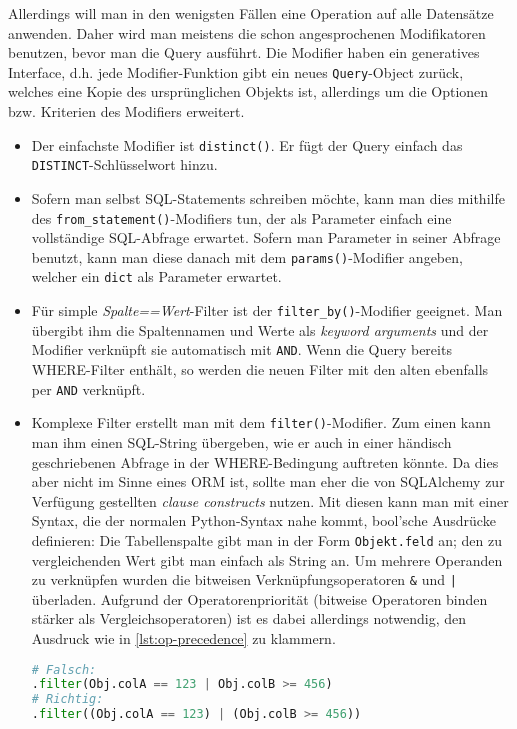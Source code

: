 Allerdings will man in den wenigsten Fällen eine Operation auf alle Datensätze
anwenden. Daher wird man meistens die schon angesprochenen Modifikatoren
benutzen, bevor man die Query ausführt. Die Modifier haben ein generatives
Interface, d.h. jede Modifier-Funktion gibt ein neues \texttt{Query}-Object
zurück, welches eine Kopie des ursprünglichen Objekts ist, allerdings um die
Optionen bzw. Kriterien des Modifiers erweitert.

\begin{itemize}
\item Der einfachste Modifier ist \texttt{distinct()}. Er fügt der Query einfach
das \texttt{DISTINCT}-Schlüsselwort hinzu.


\item Sofern man selbst SQL-Statements schreiben möchte, kann man dies mithilfe
des \texttt{from\_statement()}-Modifiers tun, der als Parameter einfach eine
vollständige SQL-Abfrage erwartet. Sofern man Parameter in seiner Abfrage
benutzt, kann man diese danach mit dem \texttt{params()}-Modifier angeben,
welcher ein \texttt{dict} als Parameter erwartet.


\item Für simple \emph{Spalte==Wert}-Filter ist der
\texttt{filter\_by()}-Modifier geeignet. Man übergibt ihm die Spaltennamen und
Werte als \textit{keyword arguments} und der Modifier verknüpft sie automatisch
mit \texttt{AND}. Wenn die Query bereits WHERE-Filter enthält, so werden die
neuen Filter mit den alten ebenfalls per \texttt{AND} verknüpft.


\item Komplexe Filter erstellt man mit dem \texttt{filter()}-Modifier. Zum einen
kann man ihm einen SQL-String übergeben, wie er auch in einer händisch
geschriebenen Abfrage in der WHERE-Bedingung auftreten könnte. Da dies aber
nicht im Sinne eines ORM ist, sollte man eher die von SQLAlchemy zur Verfügung
gestellten \emph{clause constructs} nutzen. Mit diesen kann man mit einer
Syntax, die der normalen Python-Syntax nahe kommt, bool'sche Ausdrücke
definieren: Die Tabellenspalte gibt man in der Form \texttt{Objekt.feld} an; den
zu vergleichenden Wert gibt man einfach als String an. Um mehrere Operanden zu
verknüpfen wurden die bitweisen Verknüpfungsoperatoren \texttt{\&} und
\texttt{|} überladen. Aufgrund der Operatorenpriorität (bitweise Operatoren binden
stärker als Vergleichsoperatoren) ist es dabei allerdings notwendig, den
Ausdruck wie in \autoref{lst:op-precedence} zu klammern.
\begin{lstlisting}[language=Python,label=lst:op-precedence,caption=Korrekte
Klammerung]
# Falsch:
.filter(Obj.colA == 123 | Obj.colB >= 456)
# Richtig:
.filter((Obj.colA == 123) | (Obj.colB >= 456))
\end{lstlisting}


\end{itemize}
